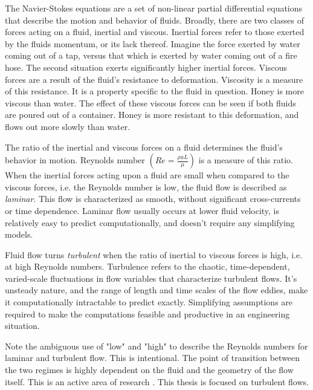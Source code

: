 The Navier-Stokes equations are a set of non-linear partial differential equations that describe the motion and behavior of fluids. Broadly, there are two classes of forces acting on a fluid, inertial and viscous. Inertial forces refer to those exerted by the fluids momentum, or its lack thereof. Imagine the force exerted by water coming out of a tap, versus that which is exerted by water coming out of a fire hose. The second situation exerts significantly higher inertial forces. Viscous forces are a result of the fluid's resistance to deformation. Viscosity is a measure of this resistance. It is a property specific to the fluid in question. Honey is more viscous than water. The effect of these viscous forces can be seen if both fluids are poured out of a container. Honey is more resistant to this deformation, and flows out more slowly than water.

The ratio of the inertial and viscous forces on a fluid determines the fluid's behavior in motion. Reynolds number $\left ( Re = \frac{\rho u L}{\mu}\right )$ is a measure of this ratio. When the inertial forces acting upon a fluid are small when compared to the viscous forces, i.e. the Reynolds number is low, the fluid flow is described as \textit{laminar}. This flow is characterized as smooth, without significant cross-currents or time dependence. Laminar flow usually occurs at lower fluid velocity, is relatively easy to predict computationally, and doesn't require any simplifying models.

Fluid flow turns \textit{turbulent} when the ratio of inertial to viscous forces is high, i.e. at high Reynolds numbers. Turbulence refers to the chaotic, time-dependent, varied-scale fluctuations in flow variables that characterize turbulent flows. It's unsteady nature, and the range of length and time scales of the flow eddies, make it computationally intractable to predict exactly. Simplifying assumptions are required to make the computations feasible and productive in an engineering situation. 

Note the ambiguous use of "low" and "high" to describe the Reynolds numbers for laminar and turbulent flow. This is intentional. The point of transition between the two regimes is highly dependent on the fluid and the geometry of the flow itself. This is an active area of research \cite{arnal2000laminar}. This thesis is focused on turbulent flows. 